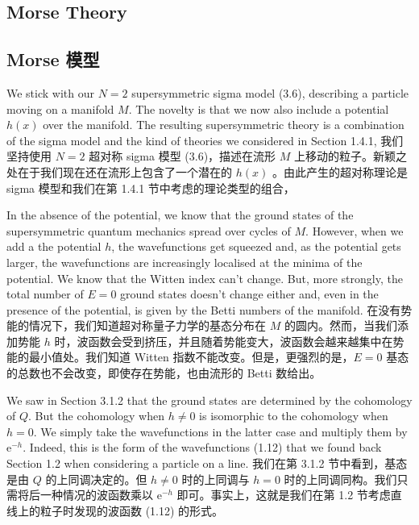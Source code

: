 \documentclass{ctexart}
\newcommand{\rme}{\mathrm{e}}
\begin{document}
\begin{paracol}{2}
\subsection{Morse Theory}
\switchcolumn
\subsection*{Morse 模型}
\switchcolumn*

We stick with our $N = 2$ supersymmetric sigma model (3.6), describing a particle moving on a manifold $M$. The novelty is that we now also include a potential $h(x)$ over the manifold. The resulting supersymmetric theory is a combination of the sigma model and the kind of theories we considered in Section 1.4.1,
\switchcolumn
我们坚持使用 $N = 2$ 超对称 sigma 模型 (3.6)，描述在流形 $M$ 上移动的粒子。新颖之处在于我们现在还在流形上包含了一个潜在的 $h(x)$ 。由此产生的超对称理论是 sigma 模型和我们在第 1.4.1 节中考虑的理论类型的组合，
\switchcolumn*

In the absence of the potential, we know that the ground states of the supersymmetric quantum mechanics spread over cycles of $M$. However, when we add a the potential $h$, the wavefunctions get squeezed and, as the potential gets larger, the wavefunctions are increasingly localised at the minima of the potential. We know that the Witten index can’t change. But, more strongly, the total number of $E = 0$ ground states doesn’t change either and, even in the presence of the potential, is given by the Betti numbers of the manifold.
\switchcolumn
在没有势能的情况下，我们知道超对称量子力学的基态分布在 $M$ 的圆内。然而，当我们添加势能 $h$ 时，波函数会受到挤压，并且随着势能变大，波函数会越来越集中在势能的最小值处。我们知道 Witten 指数不能改变。但是，更强烈的是，$E = 0$ 基态的总数也不会改变，即使存在势能，也由流形的 Betti 数给出。
\switchcolumn*

We saw in Section 3.1.2 that the ground states are determined by the cohomology of $Q$. But the cohomology when $h \neq 0$ is isomorphic to the cohomology when $h = 0$. We simply take the wavefunctions in the latter case and multiply them by $\rme^{- h}$. Indeed, this is the form of the wavefunctions (1.12) that we found back Section 1.2 when considering a particle on a line.
\switchcolumn
我们在第 3.1.2 节中看到，基态是由 $Q$ 的上同调决定的。但 $h \neq 0$ 时的上同调与 $h = 0$ 时的上同调同构。我们只需将后一种情况的波函数乘以 $\rme^{- h}$ 即可。事实上，这就是我们在第 1.2 节考虑直线上的粒子时发现的波函数 (1.12) 的形式。
\switchcolumn*


\end{paracol}
\end{document}
